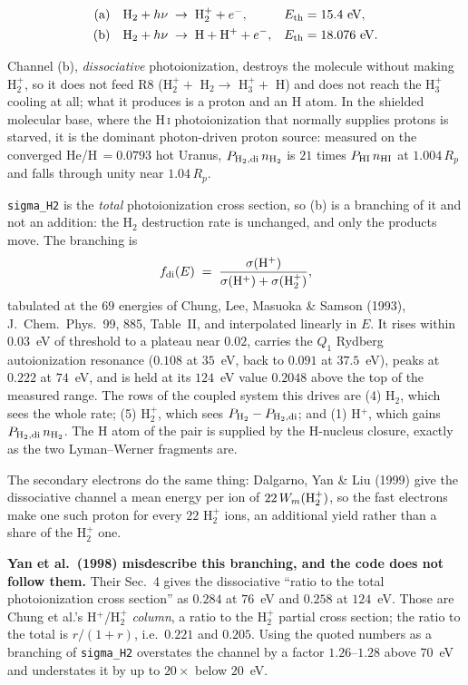 \documentclass[english,a4paper]{my_memo}
\begin{document}
\begin{align}
  \text{(a)}\quad \mathrm{H_2} + h\nu &\;\to\; \mathrm{H_2^+} + e^-,
    & E_{\rm th} &= 15.4~\text{eV},\\
  \text{(b)}\quad \mathrm{H_2} + h\nu &\;\to\; \mathrm{H} + \mathrm{H^+} + e^-,
    & E_{\rm th} &= 18.076~\text{eV}.
\end{align}

Channel (b), \emph{dissociative} photoionization, destroys the molecule
without making H$_2^+$, so it does not feed R8 (H$_2^+ +$ H$_2 \to$ H$_3^+ +$
H) and does not reach the H$_3^+$ cooling at all; what it produces is a
proton and an H atom. In the shielded molecular base, where the H\,\textsc{i}
photoionization that normally supplies protons is starved, it is the
dominant photon-driven proton source: measured on the converged
He/H\,$=0.0793$ hot Uranus, $P_{\rm H_2,di}\,n_{\rm H_2}$ is $21$ times
$P_{\rm HI}\,n_{\rm HI}$ at $1.004\,R_p$ and falls through unity near
$1.04\,R_p$.

\texttt{sigma\_H2} is the \emph{total} photoionization cross section, so (b)
is a branching of it and not an addition: the H$_2$ destruction rate is
unchanged, and only the products move. The branching is
\[
  f_{\rm di}(E) \;=\;
  \frac{\sigma(\mathrm{H^+})}{\sigma(\mathrm{H^+}) + \sigma(\mathrm{H_2^+})},
\]
tabulated at the $69$ energies of Chung, Lee, Masuoka \& Samson (1993),
J.\ Chem.\ Phys.\ 99, 885, Table~II, and interpolated linearly in $E$. It
rises within $0.03$~eV of threshold to a plateau near $0.02$, carries the
$Q_1$ Rydberg autoionization resonance ($0.108$ at $35$~eV, back to $0.091$
at $37.5$~eV), peaks at $0.222$ at $74$~eV, and is held at its $124$~eV value
$0.2048$ above the top of the measured range. The rows of the coupled system
this drives are (4) H$_2$, which sees the whole rate; (5) H$_2^+$, which sees
$P_{\rm H_2} - P_{\rm H_2,di}$; and (1) H$^+$, which gains
$P_{\rm H_2,di}\,n_{\rm H_2}$. The H atom of the pair is supplied by the
H-nucleus closure, exactly as the two Lyman--Werner fragments are.

The secondary electrons do the same thing: Dalgarno, Yan \& Liu (1999) give
the dissociative channel a mean energy per ion of $22\,W_m({\rm H_2^+})$, so
the fast electrons make one such proton for every $22$ H$_2^+$ ions, an
additional yield rather than a share of the H$_2^+$ one.

\textbf{Yan et al.\ (1998) misdescribe this branching, and the code does not
follow them.} Their Sec.~4 gives the dissociative ``ratio to the total
photoionization cross section'' as $0.284$ at $76$~eV and $0.258$ at
$124$~eV. Those are Chung et al.'s H$^+$/H$_2^+$ \emph{column}, a ratio to the
H$_2^+$ partial cross section; the ratio to the total is $r/(1+r)$, i.e.\
$0.221$ and $0.205$. Using the quoted numbers as a branching of
\texttt{sigma\_H2} overstates the channel by a factor $1.26$--$1.28$ above
$70$~eV and understates it by up to $20\times$ below $20$~eV.
\end{document}
